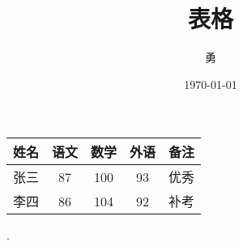 \documentclass{article}
\title{表格}
\author{勇}
\date{\today}
\begin{document}
	\maketitle
	\begin{tabular}{|l||c|c|c|p{1.5cm}|}
		\hline
		姓名 & 语文 & 数学 & 外语 & 备注\\
		\hline \hline
		张三 & 87 & 100 & 93 & 优秀\\
		\hline
		李四 & 86 & 104 & 92 & 补考\\
		\hline
	\end{tabular}.
\end{document}
